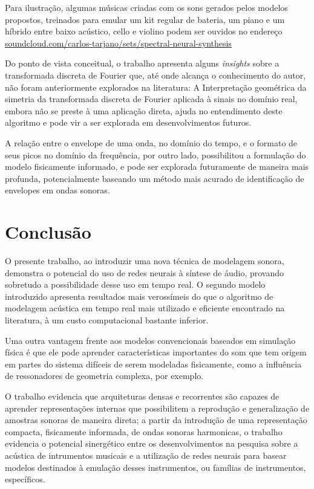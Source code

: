 \documentclass[]{article}
\begin{document}
Para ilustração, algumas músicas criadas com os sons gerados pelos
modelos propostos, treinados para emular um kit regular de bateria, um
piano e um híbrido entre baixo acústico, cello e violino podem ser
ouvidos no endereço
\href{https://soundcloud.com/carlos-tarjano/sets/spectral-neural-synthesis}{soundcloud.com/carlos-tarjano/sets/spectral-neural-synthesis}

Do ponto de vista conceitual, o trabalho apresenta alguns
\emph{insights} sobre a transformada discreta de Fourier que, até onde
alcança o conhecimento do autor, não foram anteriormente explorados na
literatura: A Interpretação geométrica da simetria da transformada
discreta de Fourier aplicada à sinais no domínio real, embora não se
preste à uma aplicação direta, ajuda no entendimento deste algoritmo e
pode vir a ser explorada em desenvolvimentos futuros.

A relação entre o envelope de uma onda, no domínio do tempo, e o formato
de seus picos no domínio da frequência, por outro lado, possibilitou a
formulação do modelo fisicamente informado, e pode ser explorada
futuramente de maneira mais profunda, potencialmente baseando um método
mais acurado de identificação de envelopes em ondas sonoras.

\hypertarget{conclusuxe3o}{%
\section{Conclusão}\label{conclusuxe3o}}

O presente trabalho, ao introduzir uma nova técnica de modelagem sonora,
demonstra o potencial do uso de redes neurais à síntese de áudio,
provando sobretudo a possibilidade desse uso em tempo real. O segundo
modelo introduzido apresenta resultados mais verossímeis do que o
algoritmo de modelagem acústica em tempo real mais utilizado e eficiente
encontrado na literatura, à um custo computacional bastante inferior.

Uma outra vantagem frente aos modelos convencionais baseados em
simulação física é que ele pode aprender características importantes do
som que tem origem em partes do sistema difíceis de serem modeladas
fisicamente, como a influência de ressonadores de geometria complexa,
por exemplo.

O trabalho evidencia que arquiteturas densas e recorrentes são capazes
de aprender representações internas que possibilitem a reprodução e
generalização de amostras sonoras de maneira direta; a partir da
introdução de uma representação compacta, fisicamente informada, de
ondas sonoras harmonicas, o trabalho evidencia o potencial sinergético
entre os desenvolvimentos na pesquisa sobre a acústica de intrumentos
musicais e a utilização de redes neurais para basear modelos destinados
à emulação desses instrumentos, ou famílias de instrumentos,
específicos.
\end{document}
